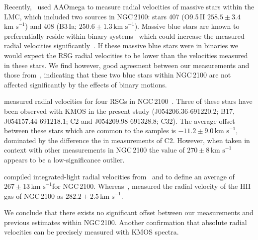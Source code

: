 \documentclass[useAMS,usenatbib]{mn2e}
\def\kms{$\mbox{km s}^{-1}$}
\begin{document}
Recently,~\cite{2015arXiv150803490E} used AAOmega to measure radial velocities of massive stars within the LMC, which included two sources in NGC\,2100: stars 407 (O9.5\,II $258.5\pm3.4$\,\kms) and 408 (B3\,Ia; $250.6\pm1.3$\,\kms).
Massive blue stars are known to preferentially reside within binary systems~\citep{2012Sci...337..444S} which could increase the measured radial velocities significantly~\citep{2012A&A...546A..73H}.
If these massive blue stars were in binaries we would expect the RSG radial velocities to be lower than the velocities measured in these stars.
We find however, good agreement between our measurements and those from~\cite{2015arXiv150803490E}, indicating that these two blue stars within NGC\,2100 are not affected significantly by the effects of binary motions.


\citet[henceforth JT94]{1994A&A...282..717J} measured radial velocities for four RSGs in NGC\,2100~\citep[B17, C2, C32 and C34, using the nomenclature of][]{1974A&AS...15..261R}.
Three of these stars have been observed with KMOS in the present study (J054206.36-691220.2; B17, J054157.44-691218.1; C2 and J054209.98-691328.8; C32).
The average offset between these stars which are common to the samples is $-11.2\pm9.0$\,\kms, dominated by the difference the in measurements of C2.
However, when taken in context with other measurements in NGC\,2100 the value of $270\pm8\,$\kms appears to be a low-significance outlier.


\cite{1983ApJ...272..488F} compiled integrated-light radial velocities from~\cite{1972MNRAS.159..445A} and
\cite{1970PhD...........F} to define an average of $267\pm13\,$\kms for NGC\,2100.
Whereas~\cite{1971ApJ...169..271S}, measured the radial velocity of the HII gas of NGC\,2100 as $282.2\pm2.5\,$\kms.

We conclude that there exists no significant offset between our measurements and previous estimates within NGC\,2100.
Another confirmation that absolute radial velocities can be precisely measured with KMOS spectra.

\end{document}
